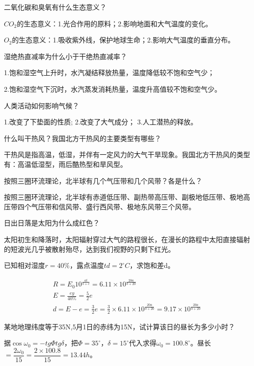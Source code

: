 \documentclass[Tailscore,contitemcnt,answers]{nwsuafexam}%
\begin{document}
\begin{questions}
		\question
		二氧化碳和臭氧有什么生态意义？
		\begin{Answers}
			$CO_2$的生态意义：1.光合作用的原料；2.影响地面和大气温度的变化。
			
			$O_2$的生态意义：1.吸收紫外线，保护地球生命；2.影响大气温度的垂直分布。
		\end{Answers}
		
		\question
	    湿绝热直减率为什么小于干绝热直减率？
	    \begin{Answers}
	    	1.饱和湿空气上升时，水汽凝结释放热量，温度降低较不饱和空气少；
	    	
	    	2.饱和湿空气下沉时，水汽蒸发消耗热量，温度升高值较不饱和空气少。
	    \end{Answers}
	    
		\question
		人类活动如何影响气候？
		\begin{Answers}
			1.改变了下垫面的性质;
			2.改变了大气成分；
			3.人工潜热的释放。
		\end{Answers}
		
		\question
		什么叫干热风？我国北方干热风的主要类型有哪些？
		\begin{Answers}
			干热风是指高温，低湿，并伴有一定风力的大气干旱现象。我国北方干热风的类型有：高温低湿型，雨后酷热型和旱风型。
		\end{Answers}
		
		\question
		按照三圈环流理论，北半球有几个气压带和几个风带？各是什么？
		\begin{Answers}
			按照三圈环流理论，北半球有赤道低压带、副热带高压带、副极地低压带、极地高压带四个气压带和信风带、盛行西风带、极地东风带三个风带。
		\end{Answers}
		
		\question
		日出日落是太阳为什么成红色？
		\begin{Answers}
			太阳初生和降落时，太阳辐射穿过大气的路程很长，在漫长的路程中太阳直接辐射的短波光几乎被散射殆尽，达到我们视野的只剩下红光。
		\end{Answers}
		
		\question[5]
		已知相对湿度$r=40\%$，露点温度$td=2^\circ C$，求饱和差d。
		\begin{Answers}[8]
			\begin{gather*}
				R=E_0 10^{\frac{at}{b+c}}=6.11\times 10^{\frac{20a}{b+20}} \\
				E=\frac{ey}{40\%}=\frac{5}{2}e \\
				d=E-e=\frac{3}{2}e=\frac{3}{2}\times 6.11\times 10^{\frac{20a}{b+20}}=9.17\times 10^{\frac{20a}{b+20}}
			\end{gather*}
		\end{Answers}
		
		\question[5]
		某地地理纬度等于35N,5月1日的赤纬为15N，试计算该日的昼长为多少小时？
		\begin{Answers}[6]
			据$\cos\omega_0=-tg\varPhi tg\delta$，把$\varPhi=35^\circ$，$\delta=15^\circ$代入求得$\omega_0=100.8^\circ$。昼长$=\dfrac{2\omega_0}{15}=\dfrac{2\times100.8}{15}=13.44h$。
		\end{Answers}
	\end{questions}
\end{document}
